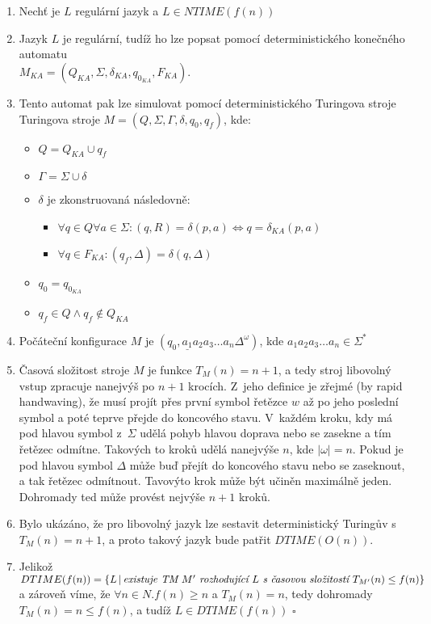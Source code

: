 \documentclass[a4paper]{article}
\begin{document}
\section*{}
\begin{enumerate}
    \item Nechť je $L$ regulární jazyk a $L \in NTIME(f(n))$
    \item Jazyk $L$ je regulární, tudíž ho lze popsat pomocí deterministického konečného automatu\\ $M_{KA}=(Q_{KA},\Sigma, \delta_{KA}, q_{0_{KA}}, F_{KA})$.
    \item Tento automat pak lze simulovat pomocí deterministického Turingova stroje Turingova stroje $M=(Q, \Sigma, \Gamma, \delta, q_0, q_f)$, kde:
    \begin{itemize}
        \item $Q=Q_{KA}\cup {q_f}$
        \item $\Gamma = \Sigma \cup {\delta}$
        \item $\delta$ je zkonstruovaná následovně:
        \begin{itemize}
            \item $\forall q \in Q \forall a \in \Sigma: (q,R) = \delta(p,a) \Leftrightarrow q=\delta_{KA}(p,a)$
            \item $\forall q \in F_{KA}: (q_f,\Delta) = \delta(q,\Delta)$
        \end{itemize}
        \item $q_0 = q_{0_{KA}}$
        \item $q_f \in Q \wedge q_f \notin Q_{KA}$
    \end{itemize}
    \item Počáteční konfigurace $M$ je $(q_0,\underline{a_1} a_2 a_3\ldots a_n\Delta^{\omega})$, kde $a_1a_2a_3\ldots a_n \in \Sigma^*$
    \item Časová složitost stroje $M$ je funkce $T_M(n)=n+1$, a tedy stroj libovolný vstup zpracuje nanejvýš po $n+1$ krocích.
    Z~jeho definice je zřejmé (by rapid handwaving), že musí projít přes první symbol řetězce $w$ až po jeho poslední symbol a poté teprve
    přejde do koncového stavu.
    V~každém kroku, kdy má pod hlavou symbol z~$\Sigma$ udělá pohyb hlavou doprava nebo se zasekne a tím řetězec odmítne.
    Takových to kroků udělá nanejvýše $n$, kde $|\omega| = n$.
    Pokud je pod hlavou symbol $\Delta$ může buď přejít do koncového stavu nebo se zaseknout, a tak řetězec odmítnout.
    Tavovýto krok může být učiněn maximálně jeden.
    Dohromady ted může provést nejvýše $n+1$ kroků.
    \item Bylo ukázáno, že pro libovolný jazyk lze sestavit deterministický Turingův s~$T_M(n)=n+1$, a proto takový jazyk
    bude patřit $DTIME(O(n))$.
    \item Jelikož $DTIME(f(n)) = \{L\,|\, \emph{existuje TM }M' \emph{ rozhodující }L\emph{ s~časovou složitostí } T_{M'}(n) \leq f(n)\}$ a zároveň
    víme, že $\forall n \in N.f(n) \geq n$ a $T_M(n)=n$, tedy dohromady $T_M(n)=n \leq f(n)$, a tudíž $L\in DTIME(f(n))$ $\square$
\end{enumerate}
\end{document}
